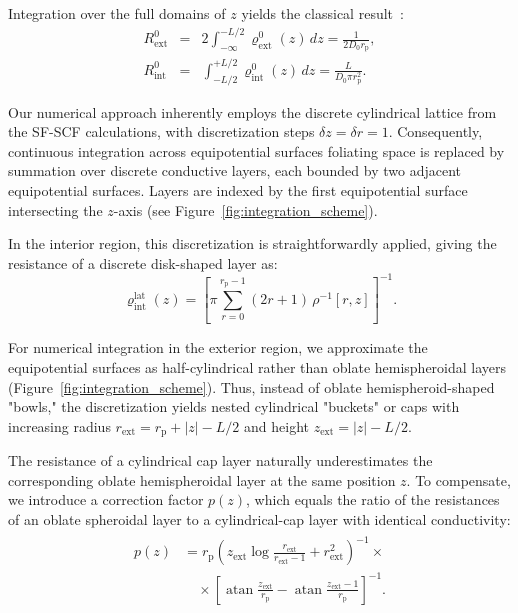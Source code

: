 \documentclass[10pt, a4paper]{article}
\begin{document}
\begin{multicols}{2}
Integration over the full domains of $z$ yields the classical result~\cite{Brunn1984}:
\begin{eqnarray}
    \label{eq:r_empty}
    R_{\text{ext}}^{0} &=& 2 \int_{-\infty}^{-L/2} \varrho_{\text{ext}}^{0}(z)\,dz = \frac{1}{2 D_0 r_{\text{p}}},\\[4pt]
    R_{\text{int}}^{0} &=& \int_{-L/2}^{+L/2} \varrho_{\text{int}}^{0}(z)\,dz = \frac{L}{D_0 \pi r_{\text{p}}^2}.
\end{eqnarray}

Our numerical approach inherently employs the discrete cylindrical lattice from the SF-SCF calculations, with discretization steps $\delta z = \delta r = 1$.
Consequently, continuous integration across equipotential surfaces foliating space is replaced by summation over discrete conductive layers, each bounded by two adjacent equipotential surfaces. 
Layers are indexed by the first equipotential surface intersecting the $z$-axis (see Figure~\ref{fig:integration_scheme}).

In the interior region, this discretization is straightforwardly applied, giving the resistance of a discrete disk-shaped layer as:
\begin{equation}
    \varrho_{\text{int}}^{\text{lat}}(z) 
    =\left[\pi \sum_{r=0}^{r_{\text{p}}-1}(2r+1)\,\rho^{-1}[r,z]\right]^{-1}.
\end{equation}

For numerical integration in the exterior region, we approximate the equipotential surfaces as half-cylindrical rather than oblate hemispheroidal layers (Figure~\ref{fig:integration_scheme}).
Thus, instead of oblate hemispheroid-shaped "bowls," the discretization yields nested cylindrical "buckets" or caps with increasing radius $r_{\text{ext}} = r_{\text{p}} + |z| - L/2$ and height $z_{\text{ext}} = |z| - L/2$.

The resistance of a cylindrical cap layer naturally underestimates the corresponding oblate hemispheroidal layer at the same position $z$.
To compensate, we introduce a correction factor $p(z)$, which equals the ratio of the resistances of an oblate spheroidal layer to a cylindrical-cap layer with identical conductivity:
\begin{gather}
    \label{eq:prefactor}
    \begin{aligned}
        p(z) &= r_{\text{p}} \left(z_{\text{ext}} \log{\frac{r_{\text{ext}}}{r_{\text{ext}} - 1}} + r_{\text{ext}}^{2}\right)^{-1} \times \\[4pt]
        &\quad\times\left[\operatorname{atan}{\frac{z_{\text{ext}}}{r_{\text{p}}}} - \operatorname{atan}{\frac{z_{\text{ext}} - 1}{r_{\text{p}}}}\right]^{-1}.
    \end{aligned}
\end{gather}


\end{multicols}
\end{document}
